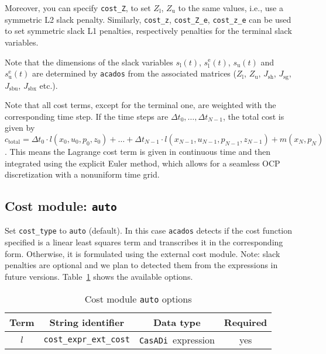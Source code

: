 \documentclass[english]{article}
\newcommand{\code}[1]{\texttt{#1}}
\newcommand{\casadi}{\texttt{CasADi}}
\newcommand{\acados}{\texttt{acados}}
\newcommand{\ind}[1]{_{\textrm{#1}}}
\newcommand{\terminal}{^{\textrm{e}}}
\newcommand{\Lower}{\ind{l}}
\newcommand{\upper}{\ind{u}}
\newcommand{\mandatory}{yes}
\begin{document}
Moreover, you can specify \code{cost\_Z}, to set $ Z\Lower$, $Z\upper$ to the same values, i.e., use a symmetric L2 slack penalty.
Similarly, \code{cost\_z}, \code{cost\_Z\_e}, \code{cost\_z\_e} can be used to set symmetric slack L1 penalties, respectively penalties for the terminal slack variables.

Note that the dimensions of the slack variables $s\Lower(t)$, $s\Lower\terminal(t)$, $s\upper(t)$ and $s\upper\terminal(t)$ are determined by \acados{} from the associated matrices ($Z\Lower$, $Z\upper$,  $J\ind{sh}$, $J\ind{sg}$, $J\ind{sbu}$, $J\ind{sbx}$ etc.).

Note that all cost terms, except for the terminal one, are weighted with the corresponding time step.
If the time steps are $\Delta t_0,\dots, \Delta t_{N-1}$, the total cost is given by $c_\text{total} = \Delta t_0 \cdot l(x_0, u_0, p_0, z_0) + \dots + \Delta t_{N-1} \cdot l(x_{N-1}, u_{N-1}, p_{N-1}, z_{N-1}) + m(x_N, p_N)$.
This means the Lagrange cost term is given in continuous time and then integrated using the explicit Euler method, which allows for a seamless OCP discretization with a nonuniform time grid.
%
\subsection{Cost module: \code{auto}}\label{sec:cost:auto}
%
Set \code{cost\_type} to \code{auto} (default).
In this case \acados{} detects if the cost function specified is a linear least squares term and transcribes it in the corresponding form.
Otherwise, it is formulated using the external cost module.
Note: slack penalties are optional and we plan to detected them from the expressions in future versions.
Table~\ref{tab:cost:auto} shows the available options.
%
\begin{table}[ht!]
    \centering
    \caption{Cost module \code{auto} options} \label{tab:cost:auto}
    \begin{tabular}{cccc}
        \toprule
        Term & String identifier & Data type & Required \\ \midrule
        $ l $ & \code{cost\_expr\_ext\_cost}    & \casadi~expression   & \mandatory  \\ 
        \bottomrule
    \end{tabular}
\end{table}
%
\end{document}
